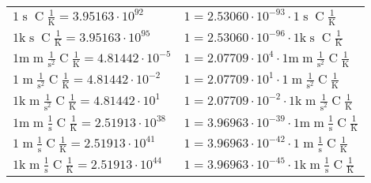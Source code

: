 \begin{center}
\begin{longtable}{l l}
{\color{black}$1 \bm{\mathrm{ }}{}{\operatorname{s}}{\operatorname{C}}\frac1{\operatorname{K}} = 3.95163\cdot10^{92} $}   & {\color{black}$ 1 = 2.53060\cdot10^{-93} \cdot 1 \bm{\mathrm{ }}{}{\operatorname{s}}{\operatorname{C}}\frac1{\operatorname{K}}$}  \\
{\color{gray}$1 \bm{\mathrm{ k}}{}{\operatorname{s}}{\operatorname{C}}\frac1{\operatorname{K}} = 3.95163\cdot10^{95} $}   & {\color{gray}$ 1 = 2.53060\cdot10^{-96} \cdot 1 \bm{\mathrm{ k}}{}{\operatorname{s}}{\operatorname{C}}\frac1{\operatorname{K}}$}  \\
{\color{gray}$1 \bm{\mathrm{ m}}{\operatorname{m}}\frac1{\operatorname{s}^2}{\operatorname{C}}\frac1{\operatorname{K}} = 4.81442\cdot10^{-5} $}   & {\color{gray}$ 1 = 2.07709\cdot10^{4} \cdot 1 \bm{\mathrm{ m}}{\operatorname{m}}\frac1{\operatorname{s}^2}{\operatorname{C}}\frac1{\operatorname{K}}$}  \\
{\color{black}$1 \bm{\mathrm{ }}{\operatorname{m}}\frac1{\operatorname{s}^2}{\operatorname{C}}\frac1{\operatorname{K}} = 4.81442\cdot10^{-2} $}   & {\color{black}$ 1 = 2.07709\cdot10^{1} \cdot 1 \bm{\mathrm{ }}{\operatorname{m}}\frac1{\operatorname{s}^2}{\operatorname{C}}\frac1{\operatorname{K}}$}  \\
{\color{gray}$1 \bm{\mathrm{ k}}{\operatorname{m}}\frac1{\operatorname{s}^2}{\operatorname{C}}\frac1{\operatorname{K}} = 4.81442\cdot10^{1} $}   & {\color{gray}$ 1 = 2.07709\cdot10^{-2} \cdot 1 \bm{\mathrm{ k}}{\operatorname{m}}\frac1{\operatorname{s}^2}{\operatorname{C}}\frac1{\operatorname{K}}$}  \\
{\color{gray}$1 \bm{\mathrm{ m}}{\operatorname{m}}\frac1{\operatorname{s}}{\operatorname{C}}\frac1{\operatorname{K}} = 2.51913\cdot10^{38} $}   & {\color{gray}$ 1 = 3.96963\cdot10^{-39} \cdot 1 \bm{\mathrm{ m}}{\operatorname{m}}\frac1{\operatorname{s}}{\operatorname{C}}\frac1{\operatorname{K}}$}  \\
{\color{black}$1 \bm{\mathrm{ }}{\operatorname{m}}\frac1{\operatorname{s}}{\operatorname{C}}\frac1{\operatorname{K}} = 2.51913\cdot10^{41} $}   & {\color{black}$ 1 = 3.96963\cdot10^{-42} \cdot 1 \bm{\mathrm{ }}{\operatorname{m}}\frac1{\operatorname{s}}{\operatorname{C}}\frac1{\operatorname{K}}$}  \\
{\color{gray}$1 \bm{\mathrm{ k}}{\operatorname{m}}\frac1{\operatorname{s}}{\operatorname{C}}\frac1{\operatorname{K}} = 2.51913\cdot10^{44} $}   & {\color{gray}$ 1 = 3.96963\cdot10^{-45} \cdot 1 \bm{\mathrm{ k}}{\operatorname{m}}\frac1{\operatorname{s}}{\operatorname{C}}\frac1{\operatorname{K}}$}  \\

\end{longtable}
\end{center}
